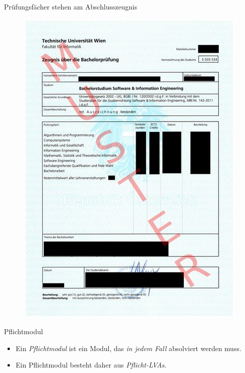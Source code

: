 \documentclass{beamer}
\begin{document}
\begin{frame}{Prüfungsfächer stehen am Abschlusszeugnis}
    \begin{figure}[htp]
        \centering
        \includegraphics[height=\textheight]{Zeugnis_über_die_Bachelorprüfung.jpg}
    \end{figure}
\end{frame}

\begin{frame}{Pflichtmodul}
    \begin{itemize}
        \item Ein \textit{Pflichtmodul} ist ein Modul, das
              \textit{in jedem Fall} absolviert werden muss.
        \item Ein Pflichtmodul besteht daher aus \textit{Pflicht-LVAs}.
    \end{itemize}
\end{frame}
\end{document}
